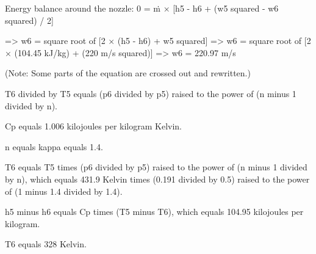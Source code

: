 Energy balance around the nozzle:  
0 = ṁ × [h5 - h6 + (w5 squared - w6 squared) / 2]  

=> w6 = square root of [2 × (h5 - h6) + w5 squared]  
=> w6 = square root of [2 × (104.45 kJ/kg) + (220 m/s squared)]  
=> w6 = 220.97 m/s  

(Note: Some parts of the equation are crossed out and rewritten.)

T6 divided by T5 equals (p6 divided by p5) raised to the power of (n minus 1 divided by n).  

Cp equals 1.006 kilojoules per kilogram Kelvin.  

n equals kappa equals 1.4.  

T6 equals T5 times (p6 divided by p5) raised to the power of (n minus 1 divided by n), which equals 431.9 Kelvin times (0.191 divided by 0.5) raised to the power of (1 minus 1.4 divided by 1.4).  

h5 minus h6 equals Cp times (T5 minus T6), which equals 104.95 kilojoules per kilogram.  

T6 equals 328 Kelvin.